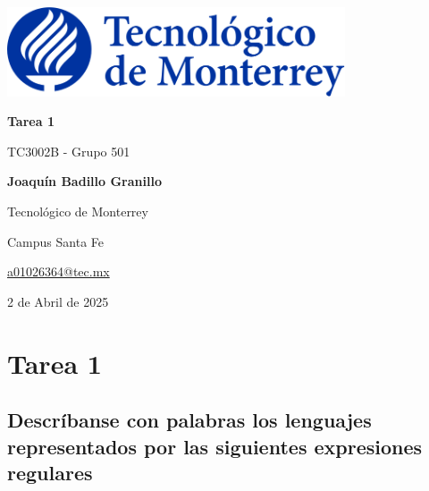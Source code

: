 \documentclass[a4paper, twoside, 12pt]{article}
\begin{document}
\begin{titlepage}
\begin{center}
		\includegraphics[width=0.75\textwidth]{Img/logo.png}
		
		\vspace{20pt}
		
		\begin{LARGE}\bf{Tarea 1}
		\end{LARGE}
		
		\vspace{50pt}

		TC3002B - Grupo 501
		
		\vspace{80pt}
        
        \textbf{Joaquín Badillo Granillo}
        
        Tecnológico de Monterrey
        
        Campus Santa Fe
        
        \href{mailto:a01026364@tec.mx}{a01026364@tec.mx}            
		
        \vspace{120pt}     
    				
		2 de Abril de 2025
	\end{center}
\end{titlepage}
\pagebreak
\section*{Tarea 1}

\subsection{Descríbanse con palabras los lenguajes representados por las siguientes expresiones regulares}
\end{document}
